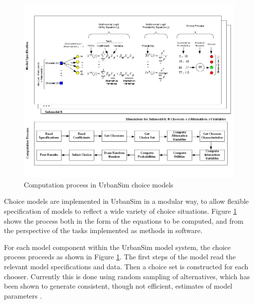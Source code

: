 \begin{figure}[htbp]
    \center
    \includegraphics[width=\textwidth]
    {graphics/ChoiceProcess.png}
    \caption{Computation process in UrbanSim choice models}
    \label{fig:choiceprocess}
\end{figure}

Choice models are implemented in UrbanSim in a modular way, to allow flexible specification of models to reflect a wide variety of choice situations. Figure \ref{fig:choiceprocess} shows the process both in the form of the equations to be computed, and from the perspective of the tasks implemented as methods in software.

For each model component within the UrbanSim model system, the choice process proceeds as shown in Figure \ref{fig:choiceprocess}. The first steps of the model read the relevant model specifications and data. Then a choice set is constructed for each chooser. Currently this is done using random sampling of alternatives, which has been shown to generate consistent, though not efficient, estimates of model parameters \citep{ben-akiva-lerman-1987}.


